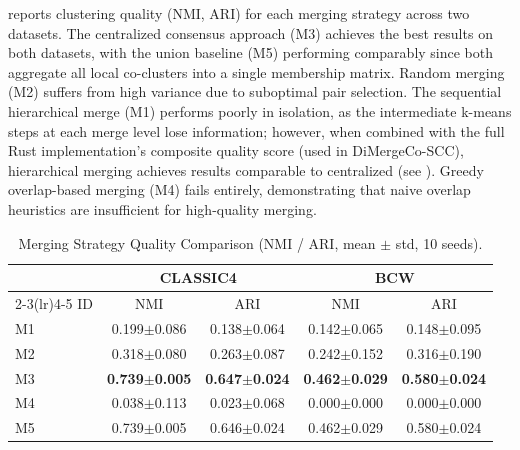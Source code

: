 \documentclass[journal]{IEEEtran}
\theoremstyle{definition}
\theoremstyle{remark} %
\begin{document}
{ reports clustering quality (NMI, ARI) for each merging strategy across two datasets. The centralized consensus approach (M3) achieves the best results on both datasets, with the union baseline (M5) performing comparably since both aggregate all local co-clusters into a single membership matrix. Random merging (M2) suffers from high variance due to suboptimal pair selection. The sequential hierarchical merge (M1) performs poorly in isolation, as the intermediate k-means steps at each merge level lose information; however, when combined with the full Rust implementation's composite quality score (used in DiMergeCo-SCC), hierarchical merging achieves results comparable to centralized (see ). Greedy overlap-based merging (M4) fails entirely, demonstrating that naive overlap heuristics are insufficient for high-quality merging.

\begin{table}[htbp]
    \centering
    \caption{Merging Strategy Quality Comparison (NMI / ARI, mean $\pm$ std, 10 seeds).}
    \label{tab:merging-quality}
    \begin{threeparttable}
        \begin{tabular}{@{} l cc cc @{}}
            \toprule
                 & \multicolumn{2}{c}{CLASSIC4}                                     & \multicolumn{2}{c}{BCW}                                                                                                                                         \\
            \cmidrule(lr){2-3}\cmidrule(lr){4-5}
            ID   & NMI                                        & ARI                   & NMI                                        & ARI                                                                             \\
            \midrule
            M1   & 0.199$\pm$0.086          & 0.138$\pm$0.064          & 0.142$\pm$0.065          & 0.148$\pm$0.095          \\
            M2   & 0.318$\pm$0.080          & 0.263$\pm$0.087          & 0.242$\pm$0.152          & 0.316$\pm$0.190          \\
            M3   & \textbf{0.739$\pm$0.005} & \textbf{0.647$\pm$0.024} & \textbf{0.462$\pm$0.029} & \textbf{0.580$\pm$0.024} \\
            M4   & 0.038$\pm$0.113          & 0.023$\pm$0.068          & 0.000$\pm$0.000          & 0.000$\pm$0.000          \\
            M5   & 0.739$\pm$0.005          & 0.646$\pm$0.024          & 0.462$\pm$0.029          & 0.580$\pm$0.024          \\
            \bottomrule
        \end{tabular}
    \end{threeparttable}
\end{table}

}
\end{document}
